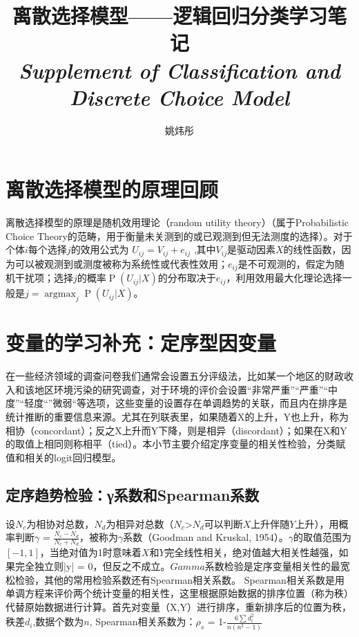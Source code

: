 \documentclass[cn]{elegantpaper}
\title{离散选择模型——逻辑回归分类学习笔记\\ \emph{Supplement of Classification and Discrete Choice Model}}
\author{姚炜彤}
\begin{document}
\maketitle


\section{离散选择模型的原理回顾}
离散选择模型的原理是随机效用理论（random utility theory）（属于Probabilistic Choice Theory的范畴，用于衡量未关测到的或已观测到但无法测度的选择）。对于个体$i$每个选择$j$的效用公式为 $U_{ij} = V_{ij}+e_{ij}$ ,其中$V_{ij}$是驱动因素$X$的线性函数，因为可以被观测到或测度被称为系统性或代表性效用；$e_{ij}$是不可观测的，假定为随机干扰项；选择$j$的概率$\operatorname{P} (U_{ij}|X)$的分布取决于$e_{ij}$，利用效用最大化理论选择一般是$j=\operatorname{argmax}_{j} \operatorname{P} (U_{ij}|X)$。

\section{变量的学习补充：定序型因变量}
在一些经济领域的调查问卷我们通常会设置五分评级法，比如某一个地区的财政收入和该地区环境污染的研究调查，对于环境的评价会设置“非常严重”“严重”“中度”“轻度“”微弱“等选项，这些变量的设置存在单调趋势的关联，而且内在排序是统计推断的重要信息来源。尤其在列联表里，如果随着X的上升，Y也上升，称为相协（concordant）；反之X上升而Y下降，则是相异（discordant）；如果在X和Y的取值上相同则称相平（tied）。本小节主要介绍定序变量的相关性检验，分类赋值和相关的logit回归模型。
\subsection{定序趋势检验：γ系数和Spearman系数}
设$N_{c}$为相协对总数，$N_{d}$为相异对总数（$N_{c}$>$N_{d}$可以判断$X$上升伴随$Y$上升），用概率判断$\gamma$ = $\frac{N_{c}-N_{d}}{N_{c}+N_{d}}$，被称为$\gamma$系数（Goodman and Kruskal, 1954）。$\gamma$的取值范围为$[-1,1]$，当绝对值为1时意味着$X$和$Y$完全线性相关，绝对值越大相关性越强，如果完全独立则|y| = 0，但反之不成立。$Gamma$系数检验是定序变量相关性的最宽松检验，其他的常用检验系数还有Spearman相关系数。
Spearman相关系数是用单调方程来评价两个统计变量的相关性，这里根据原始数据的排序位置（称为秩）代替原始数据进行计算。首先对变量（X,Y）进行排序，重新排序后的位置为秩，秩差$d_{i}$,数据个数为$n$, Spearman相关系数为：$\rho_{s}$ = 1-$\frac{6\sum d_{i}^2}{n(n^2-1)}$
\end{document}
